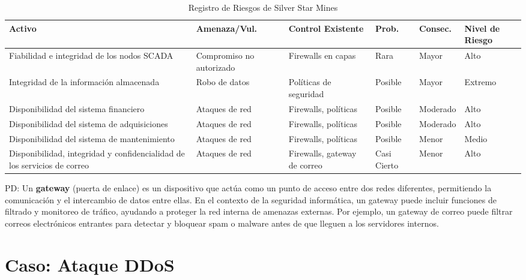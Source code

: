 \begin{table}[h]
    \centering
    \caption{Registro de Riesgos de Silver Star Mines}
    \begin{tabularx}{\textwidth}{@{}X X X X X X@{}}
        \toprule
        \textbf{Activo} & \textbf{Amenaza/Vul.} & \textbf{Control Existente} & \textbf{Prob.} & \textbf{Consec.} & \textbf{Nivel de Riesgo} \\ \midrule
        Fiabilidad e integridad de los nodos SCADA & Compromiso no autorizado & Firewalls en capas & Rara & Mayor & Alto \\ \hline
        Integridad de la información almacenada & Robo de datos & Políticas de seguridad & Posible & Mayor & Extremo \\ \hline
        Disponibilidad del sistema financiero & Ataques de red & Firewalls, políticas & Posible & Moderado & Alto \\ \hline
        Disponibilidad del sistema de adquisiciones & Ataques de red & Firewalls, políticas & Posible & Moderado & Alto \\ \hline
        Disponibilidad del sistema de mantenimiento & Ataques de red & Firewalls, políticas & Posible & Menor & Medio \\ \hline
        Disponibilidad, integridad y confidencialidad de los servicios de correo & Ataques de red & Firewalls, gateway de correo & Casi Cierto & Menor & Alto \\ \bottomrule
    \end{tabularx}
\end{table}
PD: Un \textbf{gateway} (puerta de enlace) es un dispositivo que actúa como un punto de acceso entre dos redes diferentes, permitiendo la comunicación y el intercambio de datos entre ellas. En el contexto de la seguridad informática, un gateway puede incluir funciones de filtrado y monitoreo de tráfico, ayudando a proteger la red interna de amenazas externas. Por ejemplo, un gateway de correo puede filtrar correos electrónicos entrantes para detectar y bloquear spam o malware antes de que lleguen a los servidores internos.



\section{Caso:  Ataque DDoS}

